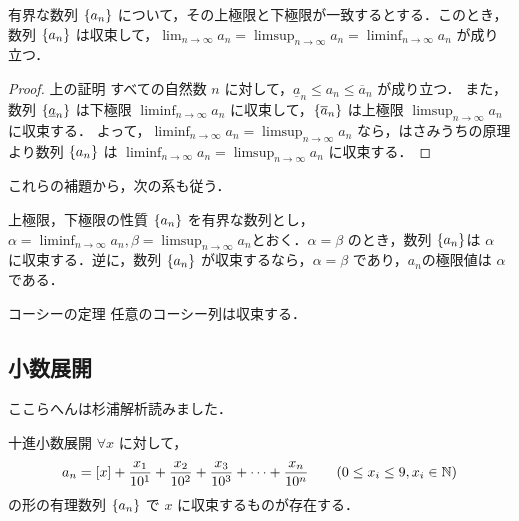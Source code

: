 \documentclass[a4paper]{ltjsarticle}
\begin{document}
  \begin{lemma}{}{}
    有界な数列 $\{a_n\}$ について，その上極限と下極限が一致するとする．このとき，数列 $\{a_n\}$ は収束して，$\displaystyle \lim_{n \to \infty} a_n = \limsup_{n \to \infty} a_n = \liminf_{n \to \infty} a_n$ が成り立つ．  
  \end{lemma}

  \begin{proof}{上の証明}{}
    すべての自然数 $n$ に対して，$\underline{a}_n \leq a_n \leq \overline{a}_n$ が成り立つ．
    また，数列 $\{\underline{a}_n\}$ は下極限 $\displaystyle \liminf_{n \to \infty} a_n$  に収束して，$\{\overline{a}_n\}$ は上極限 $\displaystyle \limsup_{n \to \infty} a_n$ に収束する．
    よって，$\displaystyle \liminf_{n \to \infty} a_n= \displaystyle \limsup_{n \to \infty} a_n$ なら，はさみうちの原理より数列 $\{a_n\}$ は $\displaystyle \liminf_{n \to \infty} a_n = \displaystyle \limsup_{n \to \infty} a_n$ に収束する．
  \end{proof}
  
  これらの補題から，次の系も従う．

  \begin{corollary}{上極限，下極限の性質}{}
    $\{a_n\}$ を有界な数列とし，$\alpha = \displaystyle \liminf_{n \to \infty} a_n, \beta = \displaystyle \limsup_{n \to \infty} a_n$とおく．$\alpha = \beta$ のとき，数列 $\{a_n\} $は $\alpha$ に収束する．逆に，数列 $\{a_n\}$ が収束するなら，$\alpha = \beta$ であり，${a_n}$の極限値は $\alpha$ である．
  \end{corollary}

  \begin{theorem}{コーシーの定理}{}
   任意のコーシー列は収束する．
  \end{theorem}

  \subsection{小数展開}
  ここらへんは杉浦解析読みました．

  \begin{theorem}{十進小数展開}{}
   $\forall x$ に対して，
   \begin{align}
    \centering
    a_n = [x] + \frac{x_1}{10^1} + \frac{x_2}{10^2} + \frac{x_3}{10^3} + \cdots + \frac{x_n}{10^n} \hspace{20pt} (0 \leq x_i \leq 9, x_i \in \N) 
   \end{align}
の形の有理数列 $\{a_n\}$ で $x$ に収束するものが存在する．
  \end{theorem}
  
\end{document}

